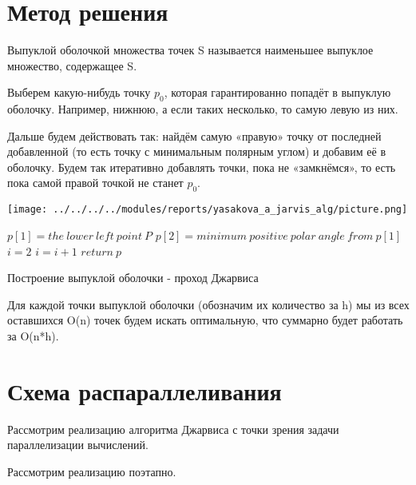 \documentclass{report}
\newenvironment{myalgorithm}[1][htb]
{\renewcommand{\algorithmcfname}{Алгоритм}
\begin{algorithm}[#1]%
}{\end{algorithm}}
\begin{document}
\newpage

\section{Метод решения}

Выпуклой оболочкой множества точек S называется наименьшее
выпуклое множество, содержащее S.

\par Выберем какую-нибудь точку $p_{0}$, которая гарантированно попадёт в выпуклую оболочку. Например, нижнюю, а если таких несколько, то самую левую из них.

\par Дальше будем действовать так: найдём самую «правую» точку от последней добавленной (то есть точку с минимальным полярным углом) и добавим её в оболочку. Будем так итеративно добавлять точки, пока не «замкнёмся», то есть пока самой правой точкой не станет $p_{0}$.

\begin{center}
\captionsetup {type = figure}
\texttt{[image: ../../../../modules/reports/yasakova\_a\_jarvis\_alg/picture.png]}
\vspace{1ex}
\end{center} 

\begin{myalgorithm}[H]
\SetAlgoLined
\BlankLine
$p[1] = the\:lower\:left\:point\:P$\;
$p[2] =minimum\:positive\:polar\:angle\:from\:p[1]$\;
$i = 2$\;
\BlankLine
{} {
$i = i + 1$\;
}
$return\:p$\;
\caption{Построение выпуклой оболочки - проход Джарвиса}
\end{myalgorithm}

\par Для каждой точки выпуклой оболочки (обозначим их количество за h) мы из всех оставшихся O(n) точек будем искать оптимальную, что суммарно будет работать за O(n*h).

\newpage

\section{Схема распараллеливания}

Рассмотрим реализацию алгоритма Джарвиса с точки зрения задачи параллелизации вычислений.

\par Рассмотрим реализацию поэтапно.
\end{document}
